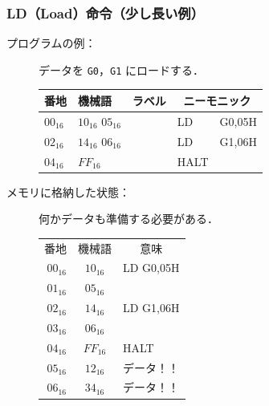 \documentclass{beamer}                 %
\begin{document}
\begin{frame}
  \frametitle{LD（Load）命令（少し長い例）}
  \begin{description}
  \item[プログラムの例：] データを \texttt{G0}，\texttt{G1} にロードする．\\
    {\ttfamily\small\begin{center}
      \begin{tabular}{|l|l|l|l l|} \hline
        番地 & 機械語 & ラベル & \multicolumn{2}{|c|}{ニーモニック} \\
        \hline
        $00_{16}$ & $10_{16}$ $05_{16}$ & & LD   & G0,05H \\
        $02_{16}$ & $14_{16}$ $06_{16}$ & & LD   & G1,06H \\
        $04_{16}$ & $FF_{16}$           & & HALT &       \\
        \hline
      \end{tabular}
    \end{center}}
    \vfill

    \item[メモリに格納した状態：] 何かデータも準備する必要がある．
      {\ttfamily\small\begin{center}
        \begin{tabular}{r|c|l}
          \multicolumn{1}{c}{番地} &
          \multicolumn{1}{c}{機械語} &
          \multicolumn{1}{c}{意味} \\
          \cline{2-2}
          $00_{16}$ & $10_{16}$ & LD G0,05H \\
          \cline{2-2}
          $01_{16}$ & $05_{16}$ &           \\
          \cline{2-2}
          $02_{16}$ & $14_{16}$ & LD G1,06H \\
          \cline{2-2}
          $03_{16}$ & $06_{16}$ &           \\
          \cline{2-2}
          $04_{16}$ & $FF_{16}$ & HALT      \\
          \cline{2-2}
          $05_{16}$ & $12_{16}$ & データ！！\\
          \cline{2-2}
          $06_{16}$ & $34_{16}$ & データ！！\\
          \cline{2-2}
        \end{tabular}
      \end{center}}
      \vfill

  \end{description}
\end{frame}
\end{document}
